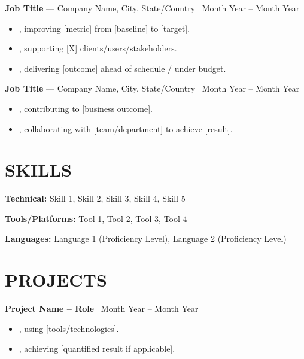 \documentclass[10.5pt, letterpaper]{article}
\newcommand{\entry}[4]{%
  \noindent\textbf{#1} --- #3, #4 \textbar\ #2\par
  \vspace{2pt}
}
\newcommand{\projectentry}[2]{%
  \noindent\textbf{#1} \textbar\ #2\par
  \vspace{2pt}
}
\newcommand{\resumeItem}[1]{\item #1}
\begin{document}
\entry{Job Title}{Month Year -- Month Year}{Company Name}{City, State/Country}
\begin{itemize}
  \resumeItem{[Action verb] [task/project], improving [metric] from [baseline] to [target].}
  \resumeItem{[Action verb] [task/project], supporting [X] clients/users/stakeholders.}
  \resumeItem{[Action verb] [task/project], delivering [outcome] ahead of schedule / under budget.}
\end{itemize}

\entry{Job Title}{Month Year -- Month Year}{Company Name}{City, State/Country}
\begin{itemize}
  \resumeItem{[Action verb] [task/project], contributing to [business outcome].}
  \resumeItem{[Action verb] [task/project], collaborating with [team/department] to achieve [result].}
\end{itemize}

\section{SKILLS}
\noindent\textbf{Technical:} Skill 1, Skill 2, Skill 3, Skill 4, Skill 5\par
\noindent\textbf{Tools/Platforms:} Tool 1, Tool 2, Tool 3, Tool 4\par
\noindent\textbf{Languages:} Language 1 (Proficiency Level), Language 2 (Proficiency Level)

\section{PROJECTS}

\projectentry{Project Name -- Role}{Month Year -- Month Year}
\begin{itemize}
  \resumeItem{[Action verb] [what was built/done], using [tools/technologies].}
  \resumeItem{[Action verb] [outcome/impact], achieving [quantified result if applicable].}
\end{itemize}

\end{document}

